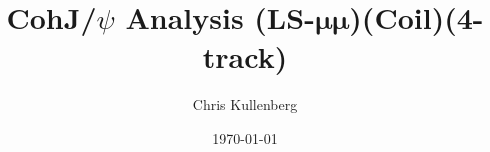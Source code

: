\title{CohJ/$\psi$ Analysis (\textbf{LS}-$\boldsymbol{\mu\mu}$)(\textbf{Coil})(\textbf{4-track})}
\author{Chris Kullenberg}
\date{\today}
